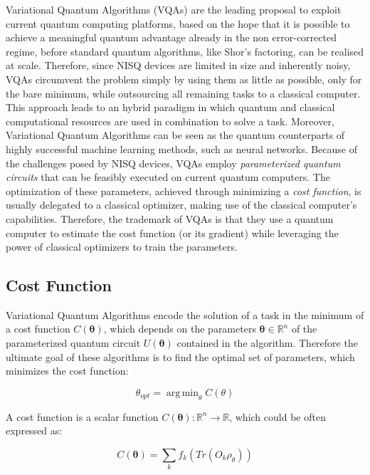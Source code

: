 Variational Quantum Algorithms (VQAs) are the leading proposal to exploit current quantum computing platforms, 
based on the hope that it is possible to achieve a meaningful quantum advantage already in the non error-corrected 
regime, before standard quantum algorithms, like Shor’s factoring, can be realised at scale. 
Therefore, since NISQ devices are limited in size and inherently noisy, VQAs circumvent the problem simply by using 
them as little as possible, only for the bare minimum, while outsourcing all remaining tasks to a classical computer.
This approach leads to an hybrid paradigm in which quantum and classical computational resources are used in combination 
to solve a task.
Moreover, Variational Quantum Algorithms can be seen as the quantum counterparts of highly successful machine 
learning methods, such as neural networks. 
Because of the challenges posed by NISQ devices, VQAs employ \textit{parameterized 
quantum circuits} that can be feasibly executed on current quantum computers. The optimization of these parameters, 
achieved through minimizing a \textit{cost function}, is usually delegated to a classical optimizer, making use of the 
classical computer's capabilities.
Therefore, the trademark of VQAs is that they use a quantum computer to estimate the cost function (or its gradient) 
while leveraging the power of classical optimizers to train the parameters.

\subsection{Cost Function}

Variational Quantum Algorithms encode the solution of a task in the minimum of a cost function $C(\boldsymbol{\theta})$,
which depends on the parameters $\boldsymbol{\theta} \in \mathds{R}^n$ of the parameterized quantum circuit $U(\boldsymbol{\theta})$ contained in the algorithm.
Therefore the ultimate goal of these algorithms is to find the optimal set of parameters, which minimizes the
cost function:

\begin{equation}
    \theta_{opt} = \operatorname{arg\,min}_{\theta} C(\theta)
\end{equation}

A cost function is a scalar function $C(\boldsymbol{\theta}) : \mathds{R}^n \rightarrow \mathds{R}$, 
which could be often expressed as:

\begin{equation}
    C(\boldsymbol{\theta}) = \sum_{k} f_k(Tr(O_k \rho_{\theta}))
\end{equation}






